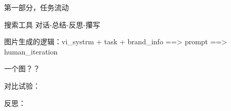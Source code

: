 第一部分，任务流动

搜索工具
对话-总结-反思-攥写

图片生成的逻辑：vi_systrm + task + brand_info ==> prompt ==> human_iteration


一个图？？




对比试验：


反思：

